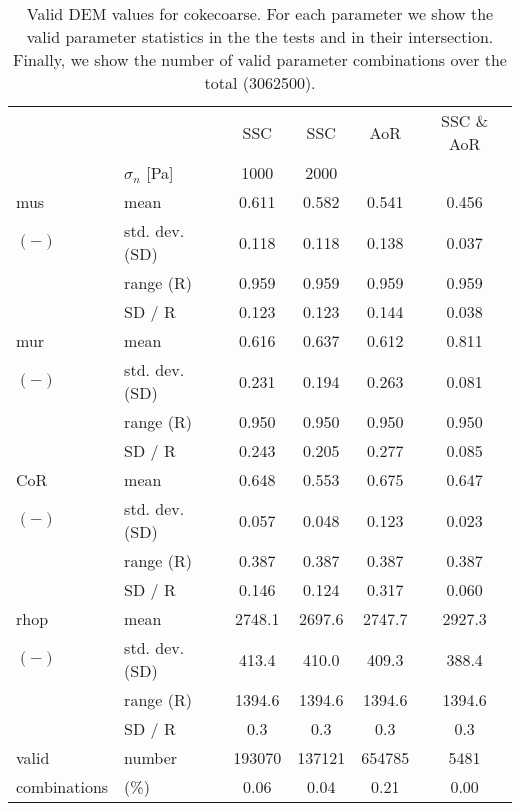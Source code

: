 \begin{table}[htbp] 
 \centering 
\begin{tabular}{ll|cccc} 
 \hline 
 &    & SSC & SSC & AoR   & SSC \& AoR \\ 
 & $\sigma_n$  [Pa]  & 1000 & 2000 &    &  \\ 
 \hline 
\acs{mus} & mean & 0.611 & 0.582 & 0.541 & 0.456 \\ 
$(-)$ & std. dev. (SD) & 0.118 & 0.118 & 0.138 & 0.037 \\ 
 & range (\acs{R}) & 0.959 & 0.959 & 0.959 & 0.959 \\ 
 & SD / R & 0.123 & 0.123 & 0.144 & 0.038 \\ 
 \hline 
\acs{mur} & mean & 0.616 & 0.637 & 0.612 & 0.811 \\ 
$(-)$ & std. dev. (SD) & 0.231 & 0.194 & 0.263 & 0.081 \\ 
 & range (\acs{R}) & 0.950 & 0.950 & 0.950 & 0.950 \\ 
 & SD / R & 0.243 & 0.205 & 0.277 & 0.085 \\ 
 \hline 
\acs{CoR} & mean & 0.648 & 0.553 & 0.675 & 0.647 \\ 
$(-)$ & std. dev. (SD) & 0.057 & 0.048 & 0.123 & 0.023 \\ 
 & range (\acs{R}) & 0.387 & 0.387 & 0.387 & 0.387 \\ 
 & SD / R & 0.146 & 0.124 & 0.317 & 0.060 \\ 
 \hline 
\acs{rhop} & mean & 2748.1 & 2697.6 & 2747.7 & 2927.3 \\ 
$(-)$ & std. dev. (SD) & 413.4 & 410.0 & 409.3 & 388.4 \\ 
 & range (\acs{R}) & 1394.6 & 1394.6 & 1394.6 & 1394.6 \\ 
 & SD / R &  0.3 &  0.3 &  0.3 &  0.3 \\ 
 \hline 
valid & number & 193070 & 137121 & 654785 & 5481 \\ 
combinations & (\%)  & 0.06 & 0.04 & 0.21 & 0.00 \\ 
 \hline 
\end{tabular} 
\caption[Valid DEM values for cokecoarse]{Valid DEM values for cokecoarse. For each parameter we show the valid parameter statistics in the the tests and in their intersection. Finally, we show the number of valid parameter combinations over the total (3062500).} 
\label{tab:25DEMvalidvaluescokecoarse} 
\end{table}